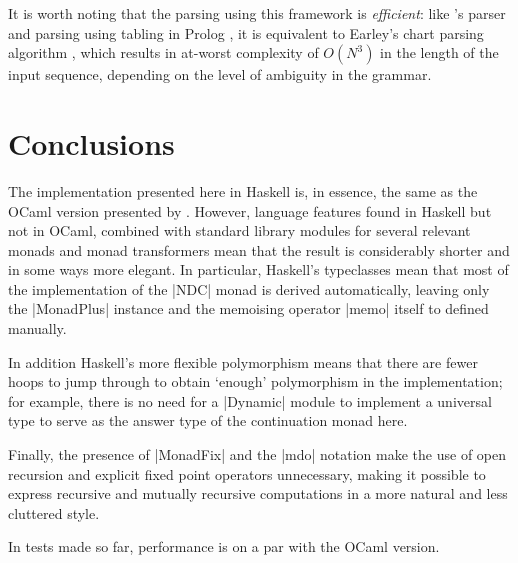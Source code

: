\documentclass[a4paper,10pt]{article}
\newcommand{\citepos}[1]{\citeauthor{#1}'s \citeyearpar{#1}\xspace}
\begin{document}
It is worth noting that the parsing using this framework is \emph{efficient}: like
\citepos{Johnson1995} parser and parsing using tabling in Prolog \citep{Abdallah2017b},
it is equivalent to Earley's chart parsing algorithm \cite{Earley1970}, which results
in at-worst complexity of $O(N^3)$ in the length of the input sequence, depending on the
level of ambiguity in the grammar.

\section{Conclusions}
The implementation presented here in Haskell is, in essence, the same as the OCaml
version presented by \cite{Abdallah2017a}. However, language features found in 
Haskell but not in OCaml, combined with standard library modules for several relevant 
monads and monad transformers mean that the result is considerably shorter and
in some ways more elegant. In particular, Haskell's typeclasses mean that most of
the implementation of the |NDC| monad is derived automatically, leaving only the
|MonadPlus| instance and the memoising operator |memo| itself to defined manually.

In addition Haskell's more flexible polymorphism means that there are fewer hoops
to jump through to obtain `enough' polymorphism in the implementation; for example, 
there is no
need for a |Dynamic| module to implement a universal type to serve as the answer type 
of the continuation monad here.

Finally, the presence of |MonadFix| and the |mdo| notation make the use of open
recursion and explicit fixed point operators unnecessary, making it possible to
express recursive and mutually recursive computations in a more natural and
less cluttered style.

In tests made so far, performance is on a par with the OCaml version.


\end{document}
